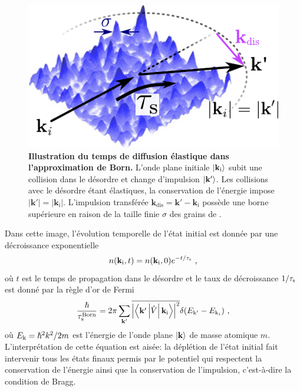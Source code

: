\begin{figure}
\centering
\includegraphics[scale=1]{Fig/TauS_PRL/illustration_contexte_taus.pdf}
\caption{\textbf{Illustration du temps de diffusion élastique dans l'approximation de Born.} L'onde plane initiale $\left| \mathbf{k}_{\mathrm{i}} \right\rangle$ subit une collision dans le désordre et change d'impulsion $\left| \mathbf{k}' \right\rangle$. Les collisions avec le désordre étant élastiques, la conservation de l'énergie impose $\left|\mathbf{k}'\right|=\left|\mathbf{k}_{\mathrm{i}}\right|$. L'impulsion transférée $\mathbf{k}_{\mathrm{dis}}=\mathbf{k}'-\mathbf{k}_{\mathrm{i}}$ possède une borne supérieure en raison de la taille finie $\sigma$ des grains de \speckle .}
\label{fig:illustration_contexte_taus}
\end{figure}


Dans cette image, l'évolution temporelle de l'état initial est donnée par une décroissance exponentielle 
\begin{equation}
n(\mathbf{k}_{\mathrm{i}},t)=n(\mathbf{k}_{\mathrm{i}},0) e^{-t/\tau_{\mathrm{s}}} \text{ ,}
\label{eq:decroissance_exponentielle_taus}
\end{equation}
où $t$ est le temps de propagation dans le désordre et le taux de décroissance $1/\tau_{\mathrm{s}}$ est donné par la règle d'or de Fermi
\begin{equation}
\frac{\hslash}{\tau_{\mathrm{s}}^{\mathrm{Born}}}=2\pi \sum_{\mathbf{k}'}{\overline{\left |\left\langle \mathbf{k}' \left|  \hat{V} \right| \mathbf{k}_{\mathrm{i}} \right\rangle \right|^2} \delta(E_{\mathrm{k}'} - E_{\mathrm{k}_i})} \text{ ,}
\label{eq:fermi_golden_rule}
\end{equation}
où $E_{\mathrm{k}}=\hslash^2 k^2 /2m$ est l'énergie de l'onde plane $\left| \mathbf{k} \right\rangle$ de masse atomique $m$. L'interprétation de cette équation est aisée: la déplétion de l'état initial fait intervenir tous les états finaux permis par le potentiel qui respectent la conservation de l'énergie ainsi que la conservation de l'impulsion, c'est-à-dire la condition de Bragg. 

